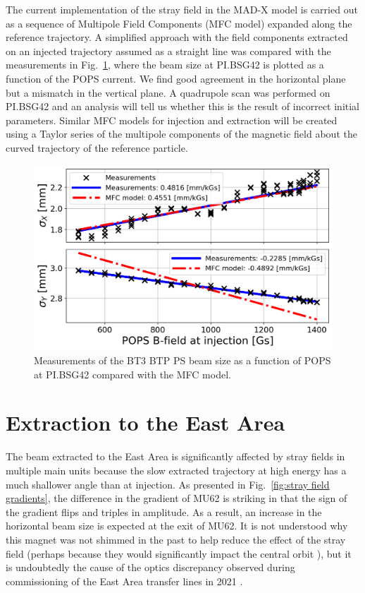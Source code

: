 \documentclass[a4paper,
               biblatex,     %
               keeplastbox,   %
               ]{jacow}
\begin{document}
The current implementation of the stray field in the \mbox{MAD-X}\cite{noauthor_mad_nodate} model is carried out as a sequence of Multipole Field Components (MFC model) expanded along the reference trajectory. A simplified approach with the field components extracted on an injected trajectory assumed as a straight line was compared with the measurements in Fig.~\ref{fig:injection_btp_beam_size}, where the beam size at PI.BSG42 is plotted as a function of the POPS current. We find good agreement in the horizontal plane but a mismatch in the vertical plane. A quadrupole scan was performed on PI.BSG42 and an analysis will tell us whether this is the result of incorrect initial parameters. Similar MFC models for injection and extraction will be created using a Taylor series of the multipole components of the magnetic field about the curved trajectory of the reference particle.

\begin{figure}[!htb]
   \centering
   \includegraphics*[width=1.0\columnwidth]{MOPOTK030_f6.png}
   \caption{Measurements of the BT3 BTP PS beam size as a function of POPS at PI.BSG42 compared with the MFC model.}
   \label{fig:injection_btp_beam_size}
\end{figure}

\section{Extraction to the East Area}
The beam extracted to the East Area is significantly affected by stray fields in multiple main units because the slow extracted trajectory at high energy has a much shallower angle than at injection. As presented in Fig.~\ref{fig:stray field gradients}, the difference in the gradient of MU62 is striking in that the sign of the gradient flips and triples in amplitude. As a result, an increase in the horizontal beam size is expected at the exit of MU62. It is not understood why this magnet was not shimmed in the past to help reduce the effect of the stray field (perhaps because they would significantly impact the central orbit \cite{Zickler:private}), but it is undoubtedly the cause of the optics discrepancy observed during commissioning of the East Area transfer lines in 2021 \cite{huschauer:ipac22-mopost006}.
\end{document}
